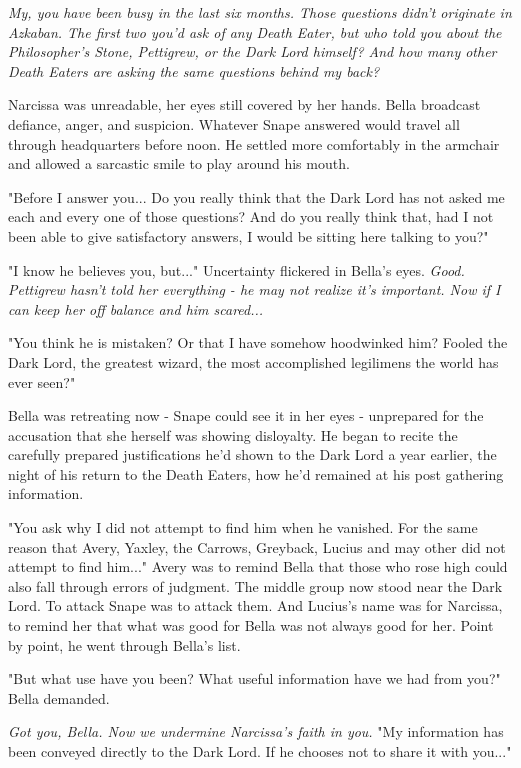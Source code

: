 \documentclass[a4paper,11pt]{article}
\begin{document}
\emph{My, you have been busy in the last six months. Those questions didn't originate in Azkaban. The first two you'd ask of any Death Eater, but who told you about the Philosopher's Stone, Pettigrew, or the Dark Lord himself? And how many other Death Eaters are asking the same questions behind my back?}

Narcissa was unreadable, her eyes still covered by her hands. Bella broadcast defiance, anger, and suspicion. Whatever Snape answered would travel all through headquarters before noon. He settled more comfortably in the armchair and allowed a sarcastic smile to play around his mouth.

"Before I answer you... Do you really think that the Dark Lord has not asked me each and every one of those questions? And do you really think that, had I not been able to give satisfactory answers, I would be sitting here talking to you?"

"I know he believes you, but..." Uncertainty flickered in Bella's eyes. \emph{Good. Pettigrew hasn't told her everything - he may not realize it's important. Now if I can keep her off balance and him scared...}

"You think he is mistaken? Or that I have somehow hoodwinked him? Fooled the Dark Lord, the greatest wizard, the most accomplished legilimens the world has ever seen?"

Bella was retreating now - Snape could see it in her eyes - unprepared for the accusation that she herself was showing disloyalty. He began to recite the carefully prepared justifications he'd shown to the Dark Lord a year earlier, the night of his return to the Death Eaters, how he'd remained at his post gathering information.

"You ask why I did not attempt to find him when he vanished. For the same reason that Avery, Yaxley, the Carrows, Greyback, Lucius and may other did not attempt to find him..." Avery was to remind Bella that those who rose high could also fall through errors of judgment. The middle group now stood near the Dark Lord. To attack Snape was to attack them. And Lucius's name was for Narcissa, to remind her that what was good for Bella was not always good for her. Point by point, he went through Bella's list.

"But what use have you been? What useful information have we had from you?" Bella demanded.

\emph{Got you, Bella. Now we undermine Narcissa's faith in you.} "My information has been conveyed directly to the Dark Lord. If he chooses not to share it with you..."
\end{document}
